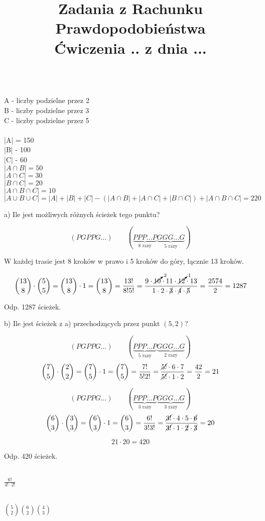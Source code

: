 \documentclass[12pt]{article}
\begin{document}
\title{Zadania z Rachunku Prawdopodobieństwa \\ Ćwiczenia .. z dnia ...}
\date{}
\medskip
{} 
\medskip


\medskip

\medskip\\
A - liczby podzielne przez 2 \\
B - liczby podzielne przez 3 \\
C - liczby podzielne przez 5 \\ \\
|A| = 150  \\
|B| - 100   \\
|C| - 60 \\
$ |A \cap B| = 50 $\\
$|A \cap C| = 30$ \\
$|B \cap C| = 20 $\\
$|A \cap B \cap C| = 10$ \\
$|A \cup B \cup C| = |A| + |B| + |C| - (|A \cap B|  + |A \cap C| + |B \cap C|) + |A \cap B \cap C| = 220  $

\medskip

a) Ile jest możliwych różnych ścieżek tego punktu?

\[(PGPPG...) \qquad 
(\underbrace{PPP...P}_{\displaystyle\text{8 razy}}
\underbrace{GGG...G}_{\displaystyle\text{5 razy}})\]

W każdej trasie jest 8 kroków w prawo i 5 kroków do góry, łącznie 13 kroków.

\[{13 \choose 8} \cdot {5 \choose 5}
={13 \choose 8} \cdot 1={13 \choose 8}
=\frac{13!}{8!5!}
=\frac{9 \cdot \cancelto{2}{10} \cdot 11 \cdot \cancelto{1}{12} \cdot 13}
{1 \cdot 2 \cdot \cancel{3} \cdot \cancel{4} \cdot \cancel{5}}
=\frac{2574}{2}=1287\]

Odp. 1287 ścieżek.

\vspace{1em}

b) Ile jest ścieżek z a) przechodzących przez punkt $(5, 2)$?

\[(PGPPG...) \qquad 
(\underbrace{PPP...P}_{\displaystyle\text{5 razy}}
\underbrace{GGG...G}_{\displaystyle\text{2 razy}})\]
\[{7 \choose 5} \cdot {2 \choose 2}
={7 \choose 5} \cdot 1
={7 \choose 5}
=\frac{7!}{5!2!}
=\frac{\cancel{5!} \cdot 6 \cdot 7}{\cancel{5!} \cdot 1 \cdot 2}
=\frac{42}{2}=21\]

\[(PGPPG...) \qquad 
(\underbrace{PPP...P}_{\displaystyle\text{3 razy}}\underbrace{GGG...G}_{\displaystyle\text{3 razy}})\]
\[{6 \choose 3} \cdot {3 \choose 3}
={6 \choose 3} \cdot 1
={6 \choose 3}
=\frac{6!}{3!3!}
=\frac{\cancel{3!} \cdot 4 \cdot 5 \cdot \cancel{6}}
{\cancel{3!} \cdot 1 \cdot \cancel{2} \cdot \cancel{3}}
=20\]

\[21  \cdot  20 = 420\]

Odp. 420 ścieżek.

\medskip

\medskip

\medskip\\
$\frac{6!}{4! \cdot 2!}$
\medskip

\medskip\\
$ {5\choose 2} {6\choose 2} {4\choose 3} $
\end{document}
